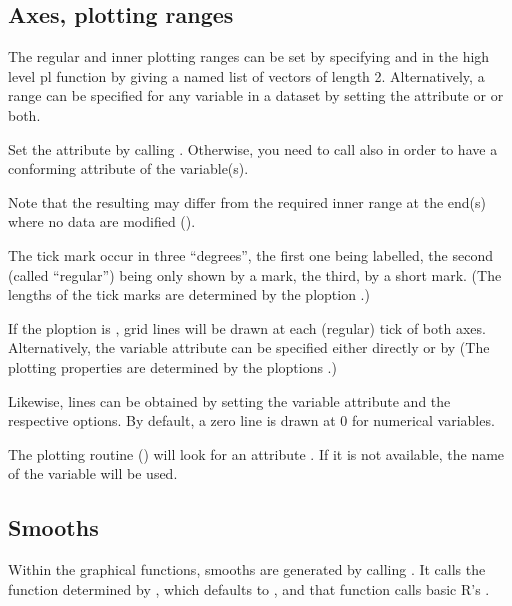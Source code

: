 \documentclass[11pt]{article}\usepackage[]{graphicx}\usepackage[]{color}
\begin{document}
\subsection{Axes, plotting ranges}

The regular and inner plotting ranges can be set by specifying
 and  in the high level pl function 
by giving a named list of vectors of length 2.
Alternatively, a range can be specified for any variable in a dataset
by setting the attribute  or
 or both.

Set the  attribute by calling . 
Otherwise, you need to call also  in order to have a conforming
 attribute of the variable(s).

Note that the resulting  may differ from the required 
inner range at the end(s) where no data are modified ().

The tick mark occur in three ``degrees'', the first one being labelled,
the second (called ``regular'') being only shown by a mark, the third, 
by a short mark.
(The lengths of the tick marks are determined by the ploption .)

If the ploption  is , grid lines will be drawn at each (regular)
tick of both axes. 
Alternatively, the variable attribute  can be specified either 
directly or by 
(The plotting properties  are determined by the ploptions
.)

Likewise, lines can be obtained by setting the variable attribute 
and the respective options. By default, a zero line is drawn at 0 for
numerical variables.

The plotting routine () will look for an attribute .
If it is not available, the name of the variable will be used.

\subsection{Smooths}

Within the graphical functions, smooths are generated by calling 
. It calls the function determined by
, which defaults to , and that
function calls basic R's .
\end{document}
